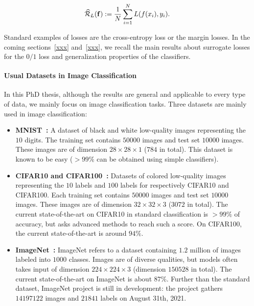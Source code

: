 \begin{align*}
\widehat{\mathcal{R}}_{L}(\mathbf{f}):= \frac{1}{N}\sum_{i=1}^N L(f(x_i),y_i).
\end{align*}

Standard examples of losses are the cross-entropy loss or the margin losses. In the coming sections~\ref{xxx} and~\ref{xxx}, we recall the main results about surrogate losses for the $0/1$ loss and generalization properties of the classifiers.



\paragraph{Usual Datasets in Image Classification}
In this PhD thesis, although the results are general and applicable to every type of data, we mainly focus on image classification tasks. Three datasets are mainly used in image classification:
\begin{itemize}
    \item \textbf{MNIST~\citep{lecun1998mnist}:} A dataset of black and white low-quality images representing the $10$ digits. The training set contains $50000$ images and test set $10000$ images. These images are of dimension $28\times28\times 1$ ($784$ in total). This dataset is known to be easy ($>99\%$ can be obtained using simple classifiers). 
    \item \textbf{CIFAR10 and CIFAR100~\citep{krizhevsky2009learning}:} Datasets of colored low-quality images representing the $10$ labels and $100$ labels for respectively CIFAR10 and CIFAR100. Each training set contains $50000$ images and test set $10000$ images. These images are of dimension $32\times32\times 3$ ($3072$ in total). The current state-of-the-art on CIFAR10 in standard classification is $>99\%$ of accuracy, but asks advanced methods to reach such a score. On CIFAR100, the current state-of-the-art is around $94\%$. 
    \item \textbf{ImageNet~\citep{imagenet_cvpr09}:} ImageNet refers to a dataset containing $1.2$ million of images labeled into $1000$ classes. Images are of diverse qualities, but models often takes input of dimension $224\times224\times 3$ (dimension $150528$ in total). The current state-of-the-art on ImageNet is about $87\%$. Further than the standard dataset, ImageNet project is still in development: the project gathers $14197122$ images and $21841$ labels on August 31th, 2021.   


\end{itemize}



